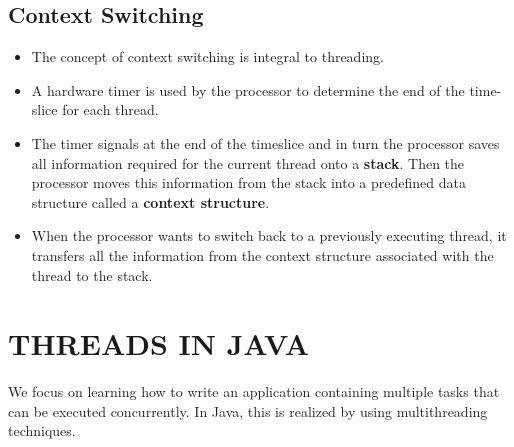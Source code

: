 \documentclass[12pt, a4paper]{book}
\begin{document}
\section{Context Switching}
\begin{itemize}
    \item The concept of context switching is integral to threading.
    \item A hardware timer is used by the processor to determine the end of the time-slice for each thread.
    \item The timer signals at the end of the timeslice and in turn the processor saves all information required for the current thread onto a \textbf{stack}. Then the processor moves this information from the stack into a predefined data structure called a \textbf{context structure}.
    \item When the processor wants to switch back to a previously executing thread, it transfers all the information from the context structure associated with the thread to the stack.
\end{itemize}

\chapter{THREADS IN JAVA}
We focus on learning how to write an application containing multiple tasks that can be executed concurrently. In Java, this is realized by using multithreading techniques.\\
\end{document}

